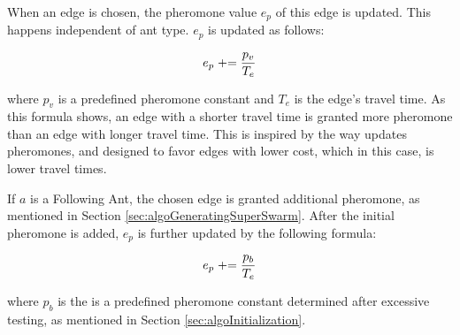 When an edge is chosen, the pheromone value $e_p$ of this edge is updated. This happens independent of ant type. $e_p$ is updated as follows:

$$e_p \mathrel{+}= \frac{p_v}{T_e}$$ 

where $p_v$ is a predefined pheromone constant and $T_e$ is the edge's travel time. As this formula shows, an edge with a shorter travel time is granted more pheromone than an edge with longer travel time. This is inspired by the way \citet{hsiao04} updates pheromones, and designed to favor edges with lower cost, which in this case, is lower travel times. 

If $a$ is a Following Ant, the chosen edge is granted additional pheromone, as mentioned in Section \vref{sec:algoGeneratingSuperSwarm}. After the initial pheromone is added, $e_p$ is further updated by the following formula:

$$e_p \mathrel{+}= \frac{p_b}{T_e}$$ 

where $p_b$ is the is a predefined pheromone constant determined after excessive testing, as mentioned in Section \vref{sec:algoInitialization}. 

